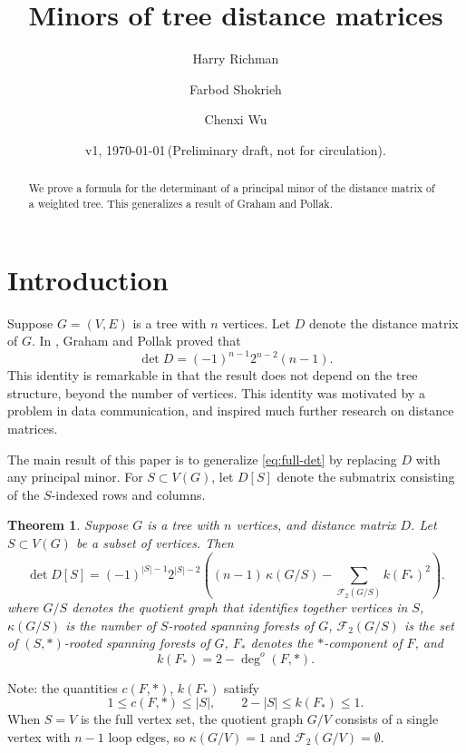 \documentclass{amsart}
\newtheorem{thm}{Theorem}
\theoremstyle{definition}
\newcommand{\forests}{\mathcal{F}}
\begin{document}
\title[Tree distance minors]{Minors of tree distance matrices}
\author{Harry Richman}
\author{Farbod Shokrieh}
\author{Chenxi Wu}
\date{v1, \today  \,(Preliminary draft, not for circulation).}


\begin{abstract}
We prove a formula for the determinant of 
a principal minor of
the distance matrix of a weighted tree.
This generalizes a result of Graham and Pollak.
\end{abstract}
\maketitle

\setcounter{tocdepth}{1}
\tableofcontents

\section{Introduction}

Suppose $G = (V,E)$ is a tree with $n$ vertices.
Let $D$ denote the distance matrix of $G$.
In
\cite{graham-pollak},
Graham and Pollak proved that
\begin{equation}\label{eq:full-det}
\det D = (-1)^{n-1} 2^{n-2} (n-1). 
\end{equation}
This identity is remarkable in that the result does not depend on the tree structure,
beyond the number of vertices.
This identity was motivated by a problem in data communication,
and inspired much further research on distance matrices.


The main result of this paper is to generalize \eqref{eq:full-det} by replacing $D$ with any principal minor.
For $S \subset V(G)$, let $D[S]$ denote the submatrix consisting of the $S$-indexed rows and columns.
\begin{thm}
\label{thm:main}
Suppose $G$ is a tree with $n$ vertices, 
and distance matrix $D$.
Let $S \subset V(G)$ be a subset of vertices.
Then
\begin{equation}\label{eq:main}
\det D[S] = (-1)^{|S|-1} 2^{|S|-2} \left( (n-1)\, \kappa(G/S)  - \sum_{\mathcal F_2(G/S)} k(F_{*})^2  \right).
\end{equation}
where 
$G/S$ denotes the quotient graph that identifies together vertices in $S$,
$\kappa(G/S)$ is the number of $S$-rooted spanning forests of $G$,
$\forests_2(G/S)$ is the set of $(S,*)$-rooted spanning forests of $G$,
$F_{*}$ denotes the $*$-component of $F$, 
and
\begin{equation*}
k(F_{*}) 
= 2 - \deg^o(F,*).
\end{equation*}
\end{thm}
Note: the quantities $c(F,*)$, $k(F_*)$ satisfy
$$
1 \leq c(F,*) \leq |S|, \qquad
2 - |S| \leq k(F_*) \leq 1 .
$$
When $S = V$ is the full vertex set, the quotient graph $G / V$ consists of a single vertex with $n-1$ loop edges, 
so $\kappa(G/V) = 1$ and $\forests_2(G/V) = \emptyset$. 
\end{document}
